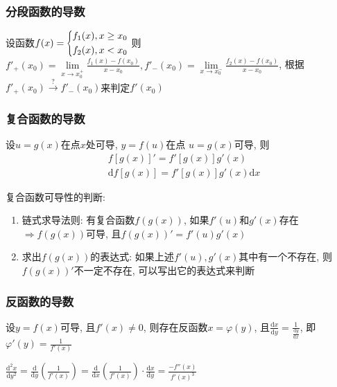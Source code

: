 \subsubsection{分段函数的导数}
设函数$ f(x)=\scaleleftright[6pt]{\biggl\{}{
\begin{aligned}
& f_{1}(x), x\ge x_{0} \\
& f_{2}(x), x< x_{0}
\end{aligned} }{.} $
则$ f'_{+}(x_{0})=\lim\limits_{x\rightarrow x_{0}^{+}}\frac{f_{1}(x)-f(x_{0})}{x-x_{0}}, f'_{-}(x_{0})=\lim\limits_{x\rightarrow x_{0}^{-}}\frac{f_{2}(x)-f(x_{0})}{x-x_{0}} $, 根据$ f'_{+}(x_{0})\xrightarrow{?}f'_{-}(x_{0}) $来判定$ f'(x_{0}) $
\subsubsection{复合函数的导数}
设$ u=g(x) $在点$ x $处可导, $ y=f(u) $在点 $ u=g(x) $可导, 则
\begin{equation*}
\begin{aligned}
& {f[g(x)]}'=f'[g(x)]g'(x) \\
& \mathrm{d}{f[g(x)]}=f'[g(x)]g'(x)\mathrm{d}x
\end{aligned}
\end{equation*}
\begin{tcolorbox}
复合函数可导性的判断:
\begin{enumerate}
\item 链式求导法则: 有复合函数$ f(g(x)) $, 如果$ f'(u) $和$ g'(x) $存在$ \Rightarrow f(g(x)) $可导, 且$ f(g(x))'=f'(u)g'(x) $
\item 求出$ f(g(x)) $的表达式: 如果上述$ f'(u), g'(x) $其中有一个不存在, 则$ f(g(x))' $不一定不存在, 可以写出它的表达式来判断
\end{enumerate}
\end{tcolorbox}
\subsubsection{反函数的导数}
设$ y=f(x) $可导, 且$ f'(x)\neq 0 $, 则存在反函数$ x=\varphi(y) $, 且$ \frac{\mathrm{d}x}{\mathrm{d}y}=\frac{1}{\frac{\mathrm{d}y}{\mathrm{d}x}} $, 即$ \varphi'(y)=\frac{1}{f'(x)} $ \par
$ \frac{\mathrm{d}^{2}x}{\mathrm{d}y^{2}}=\frac{\mathrm{d}}{\mathrm{d}y}(\frac{1}{f'(x)})=\frac{\mathrm{d}}{\mathrm{d}x}(\frac{1}{f'(x)})\cdot\frac{\mathrm{d}x}{\mathrm{d}y}=\frac{-f''(x)}{f'(x)^{3}} $
